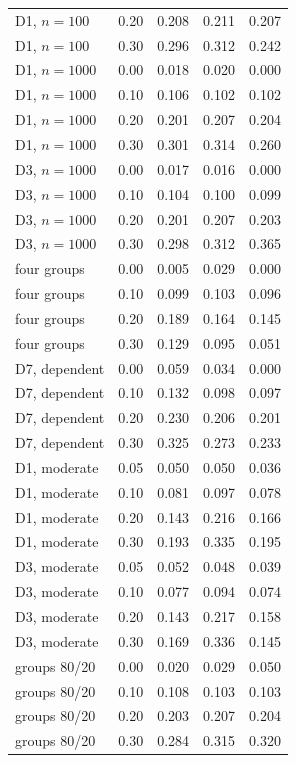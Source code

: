 {\begin{longtable}{llccc}
D1, $n=100$ & 0.20 & 0.208 & 0.211 & 0.207 \\
D1, $n=100$ & 0.30 & 0.296 & 0.312 & 0.242 \\
D1, $n=1000$ & 0.00 & 0.018 & 0.020 & 0.000 \\
D1, $n=1000$ & 0.10 & 0.106 & 0.102 & 0.102 \\
D1, $n=1000$ & 0.20 & 0.201 & 0.207 & 0.204 \\
D1, $n=1000$ & 0.30 & 0.301 & 0.314 & 0.260 \\
D3, $n=1000$ & 0.00 & 0.017 & 0.016 & 0.000 \\
D3, $n=1000$ & 0.10 & 0.104 & 0.100 & 0.099 \\
D3, $n=1000$ & 0.20 & 0.201 & 0.207 & 0.203 \\
D3, $n=1000$ & 0.30 & 0.298 & 0.312 & 0.365 \\
four groups & 0.00 & 0.005 & 0.029 & 0.000 \\
four groups & 0.10 & 0.099 & 0.103 & 0.096 \\
four groups & 0.20 & 0.189 & 0.164 & 0.145 \\
four groups & 0.30 & 0.129 & 0.095 & 0.051 \\
D7, dependent & 0.00 & 0.059 & 0.034 & 0.000 \\
D7, dependent & 0.10 & 0.132 & 0.098 & 0.097 \\
D7, dependent & 0.20 & 0.230 & 0.206 & 0.201 \\
D7, dependent & 0.30 & 0.325 & 0.273 & 0.233 \\
D1, moderate & 0.05 & 0.050 & 0.050 & 0.036 \\
D1, moderate & 0.10 & 0.081 & 0.097 & 0.078 \\
D1, moderate & 0.20 & 0.143 & 0.216 & 0.166 \\
D1, moderate & 0.30 & 0.193 & 0.335 & 0.195 \\
D3, moderate & 0.05 & 0.052 & 0.048 & 0.039 \\
D3, moderate & 0.10 & 0.077 & 0.094 & 0.074 \\
D3, moderate & 0.20 & 0.143 & 0.217 & 0.158 \\
D3, moderate & 0.30 & 0.169 & 0.336 & 0.145 \\
groups 80/20 & 0.00 & 0.020 & 0.029 & 0.050 \\
groups 80/20 & 0.10 & 0.108 & 0.103 & 0.103 \\
groups 80/20 & 0.20 & 0.203 & 0.207 & 0.204 \\
groups 80/20 & 0.30 & 0.284 & 0.315 & 0.320 \\

\end{longtable}}
